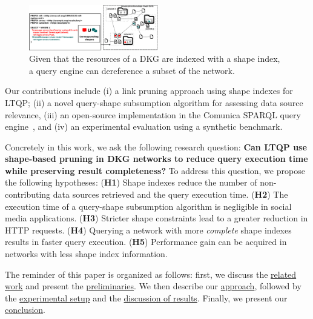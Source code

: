 \begin{figure}
   \centering
   \includegraphics[width=0.5\textwidth]{figure/dkg.pdf}
   \caption{
      Given that the resources of a DKG are indexed with a shape index, a query engine can dereference a subset of the network.
    }
    \label{fig:dkg}
\end{figure}

Our contributions include (i) a link pruning approach using shape indexes for LTQP; (ii) a novel query-shape subsumption algorithm for assessing data source relevance, (iii) an open-source implementation in the 
Comunica SPARQL query engine~\cite{taelman_iswc_resources_comunica_2018}, and (iv) an experimental evaluation using a synthetic benchmark.

Concretely in this work, we ask the following research question: 
\textbf{Can LTQP use shape-based pruning in DKG networks to reduce query execution time while preserving result completeness?}
To address this question, we propose the following hypotheses:  
(\textbf{H1}) Shape indexes reduce the number of non-contributing data sources retrieved and the query execution time.  
(\textbf{H2}) The execution time of a query-shape subsumption algorithm is negligible in social media applications.  
(\textbf{H3}) Stricter shape constraints lead to a greater reduction in HTTP requests.  
(\textbf{H4}) Querying a network with more \emph{complete} shape indexes results in faster query execution.  
(\textbf{H5}) Performance gain can be acquired in networks with less shape index information.

The reminder of this paper is organized as follows: first, we discuss the \hyperref[sec:related_work]{related work} and present the \hyperref[sec:preliminaries]{preliminaries}.
We then describe our \hyperref[sec:approach]{approach}, followed by the \hyperref[sec:experiment]{experimental setup} and the \hyperref[sec:result]{discussion of results}.
Finally, we present our \hyperref[sec:conclusion]{conclusion}.
